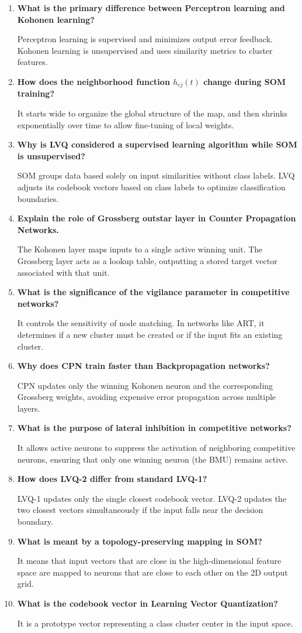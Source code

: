 \documentclass[12pt,a4paper]{article}
\newcommand{\Q}[1]{\textbf{#1}\par\noindent\ignorespaces}
\begin{document}
\begin{tcolorbox}[exambox, title={\textbf{Frequently Asked / Viva Questions}}]
\begin{enumerate}[leftmargin=*, itemsep=3.5pt, label=\arabic*.]
  \item \Q{What is the primary difference between Perceptron learning and Kohonen learning?} Perceptron learning is supervised and minimizes output error feedback. Kohonen learning is unsupervised and uses similarity metrics to cluster features.
  \item \Q{How does the neighborhood function $h_{cj}(t)$ change during SOM training?} It starts wide to organize the global structure of the map, and then shrinks exponentially over time to allow fine-tuning of local weights.
  \item \Q{Why is LVQ considered a supervised learning algorithm while SOM is unsupervised?} SOM groups data based solely on input similarities without class labels. LVQ adjusts its codebook vectors based on class labels to optimize classification boundaries.
  \item \Q{Explain the role of Grossberg outstar layer in Counter Propagation Networks.} The Kohonen layer maps inputs to a single active winning unit. The Grossberg layer acts as a lookup table, outputting a stored target vector associated with that unit.
  \item \Q{What is the significance of the vigilance parameter in competitive networks?} It controls the sensitivity of node matching. In networks like ART, it determines if a new cluster must be created or if the input fits an existing cluster.
  \item \Q{Why does CPN train faster than Backpropagation networks?} CPN updates only the winning Kohonen neuron and the corresponding Grossberg weights, avoiding expensive error propagation across multiple layers.
  \item \Q{What is the purpose of lateral inhibition in competitive networks?} It allows active neurons to suppress the activation of neighboring competitive neurons, ensuring that only one winning neuron (the BMU) remains active.
  \item \Q{How does LVQ-2 differ from standard LVQ-1?} LVQ-1 updates only the single closest codebook vector. LVQ-2 updates the two closest vectors simultaneously if the input falls near the decision boundary.
  \item \Q{What is meant by a topology-preserving mapping in SOM?} It means that input vectors that are close in the high-dimensional feature space are mapped to neurons that are close to each other on the 2D output grid.
  \item \Q{What is the codebook vector in Learning Vector Quantization?} It is a prototype vector representing a class cluster center in the input space.
\end{enumerate}
\end{tcolorbox}
\end{document}
